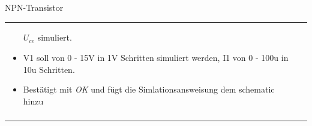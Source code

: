 \begin{frame}[t]{NPN-Transistor}
\begin{spacing}{0.9}
\begin{tiny}
\begin{table}[h!]
\begin{tabular}{p{3cm} p{7cm}}
\begin{minipage}{.7\textwidth}
\begin{itemize}
        $U_{ce}$ simuliert. 
        \item V1 soll von 0 - 15V in 1V Schritten simuliert werden, I1 von 0 - 100u in 10u Schritten.
        \item Bestätigt mit \textit{OK} und fügt die Simlationsansweisung dem schematic hinzu
      \end{itemize}
      \end{minipage} 
      \\
       & \\
       \hline
    \end{tabular}
  
  \end{table}
  
  \end{tiny} \end{spacing}
  
   \end{frame}
  
